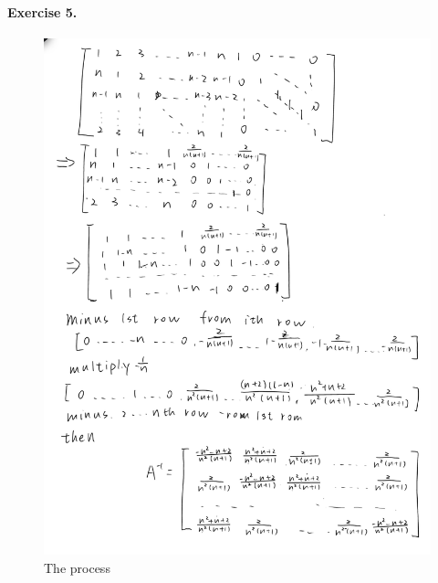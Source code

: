 \documentclass{article}
\begin{document}
\paragraph{Exercise 5.}
\begin{figure}[h]
    \centering
    \includegraphics[width=1.0\textwidth]{Capture.jpg}
    \caption{The process}
    \label{fig:example_image}
\end{figure}
\end{document}
